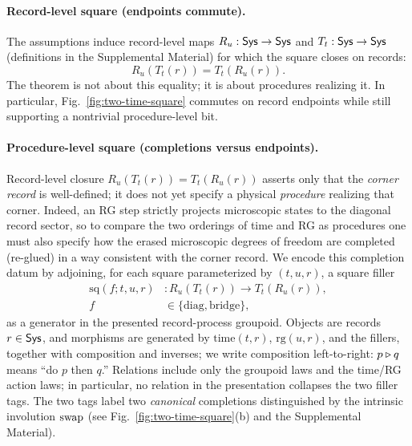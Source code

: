 \documentclass[aps,prl,reprint,floatfix]{revtex4-2}
\theoremstyle{plain}
\theoremstyle{definition}
\begin{document}
\paragraph{Record-level square (endpoints commute).}
The assumptions induce record-level maps $R_u:\mathsf{Sys}\to\mathsf{Sys}$ and $T_t:\mathsf{Sys}\to\mathsf{Sys}$
(definitions in the Supplemental Material) for which the square closes on records:
\[
R_u(T_t(r))=T_t(R_u(r)).
\]
The theorem is not about this equality; it is about procedures realizing it.
In particular, Fig.~\ref{fig:two-time-square} commutes on record endpoints while still supporting a nontrivial procedure-level bit.

\paragraph{Procedure-level square (completions versus endpoints).}
Record-level closure $R_u(T_t(r))=T_t(R_u(r))$ asserts only that the \emph{corner record} is well-defined; it does not yet specify a physical \emph{procedure} realizing that corner.
Indeed, an RG step strictly projects microscopic states to the diagonal record sector, so to compare the two orderings of time and RG as procedures one must also specify how the erased microscopic degrees of freedom are completed (re-glued) in a way consistent with the corner record.
We encode this completion datum by adjoining, for each square parameterized by $(t,u,r)$, a square filler
\[
\begin{aligned}
\mathrm{sq}(f;t,u,r)&: R_u(T_t(r)) \to T_t(R_u(r)),\\
f&\in\{\mathrm{diag},\mathrm{bridge}\},
\end{aligned}
\]
as a generator in the presented record-process groupoid.
Objects are records $r\in\mathsf{Sys}$, and morphisms are generated by $\mathrm{time}(t,r)$, $\mathrm{rg}(u,r)$, and the fillers, together with composition and inverses; we write composition left-to-right: $p\mathbin{\triangleright} q$ means ``do $p$ then $q$.''\@
Relations include only the groupoid laws and the time/RG action laws; in particular, no relation in the presentation collapses the two filler tags.
The two tags label two \emph{canonical} completions distinguished by the intrinsic involution $\operatorname{swap}$ (see Fig.~\ref{fig:two-time-square}(b) and the Supplemental Material).
\end{document}
